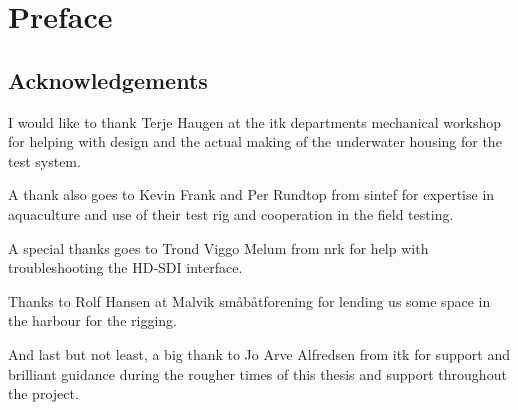 
\chapter{Preface}


\section{Acknowledgements}

I would like to thank Terje Haugen at the \gls{itk} departments mechanical workshop for 
helping with design and the actual making of the underwater housing for the test system.

A thank also goes to Kevin Frank and Per Rundtop from \gls{sintef} for expertise 
in aquaculture and use of their test rig and cooperation in the field testing. 

A special thanks goes to Trond Viggo Melum from \gls{nrk} for help with troubleshooting the HD-SDI interface.

Thanks to Rolf Hansen at Malvik småbåtforening for lending us some space in the harbour for the rigging.

And last but not least, a big thank to Jo Arve Alfredsen from \gls{itk} for support and 
brilliant guidance during the rougher times of this thesis and support throughout the project.
